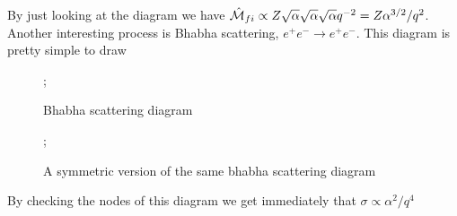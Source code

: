 \documentclass[../qm.tex]{subfiles}
\begin{document}
By just looking at the diagram we have $\hat{\mathcal{M}}_{fi}\propto Z\sqrt{\alpha}\sqrt{\alpha}\sqrt{\alpha}q^{-2}=Z\alpha^{3/2}/q^2$.\\
Another interesting process is Bhabha scattering, $e^+e^-\to e^+e^-$. This diagram is pretty simple to draw\\
\begin{minipage}[H]{0.5\linewidth}
	\begin{figure}[H]
		\centering
		;
		\caption{Bhabha scattering diagram}
		\label{fig:bhabhascatdiag}
	\end{figure}
\end{minipage}
\begin{minipage}[H]{0.5\linewidth}
	\begin{figure}[H]
		\centering
		;
		\caption{A symmetric version of the same bhabha scattering diagram}
		\label{fig:bhabha2}
	\end{figure}
\end{minipage}
By checking the nodes of this diagram we get immediately that $\sigma\propto\alpha^2/q^4$
\end{document}
